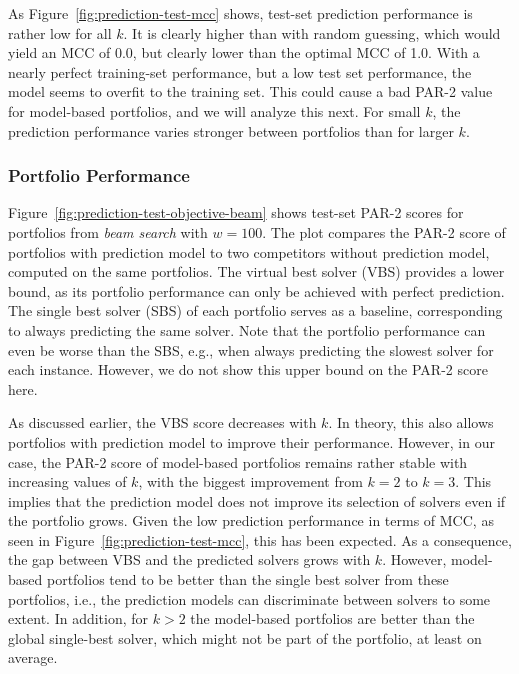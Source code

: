 \documentclass[conference]{IEEEtran}
\begin{document}
As Figure~\ref{fig:prediction-test-mcc} shows, test-set prediction performance is rather low for all $k$.
It is clearly higher than with random guessing, which would yield an MCC of 0.0, but clearly lower than the optimal MCC of 1.0.
With a nearly perfect training-set performance, but a low test set performance, the model seems to overfit to the training set.
This could cause a bad \mbox{PAR-2} value for model-based portfolios, and we will analyze this next.
For small $k$, the prediction performance varies stronger between portfolios than for larger $k$.

\subsubsection{Portfolio Performance}

Figure~\ref{fig:prediction-test-objective-beam} shows test-set PAR-2 scores for portfolios from \emph{beam search} with $w=100$.
The plot compares the PAR-2 score of portfolios with prediction model to two competitors without prediction model, computed on the same portfolios.
The virtual best solver (VBS) provides a lower bound, as its portfolio performance can only be achieved with perfect prediction.
The single best solver (SBS) of each portfolio serves as a baseline, corresponding to always predicting the same solver.
Note that the portfolio performance can even be worse than the SBS, e.g., when always predicting the slowest solver for each instance.
However, we do not show this upper bound on the PAR-2 score here.

As discussed earlier, the VBS score decreases with $k$.
In theory, this also allows portfolios with prediction model to improve their performance.
However, in our case, the \mbox{PAR-2} score of model-based portfolios remains rather stable with increasing values of $k$, with the biggest improvement from $k=2$ to $k=3$.
This implies that the prediction model does not improve its selection of solvers even if the portfolio grows.
Given the low prediction performance in terms of MCC, as seen in Figure~\ref{fig:prediction-test-mcc}, this has been expected.
As a consequence, the gap between VBS and the predicted solvers grows with $k$.
However, model-based portfolios tend to be better than the single best solver from these portfolios, i.e., the prediction models can discriminate between solvers to some extent.
In addition, for $k > 2$ the model-based portfolios are better than the global single-best solver, which might not be part of the portfolio, at least on average.
\end{document}
